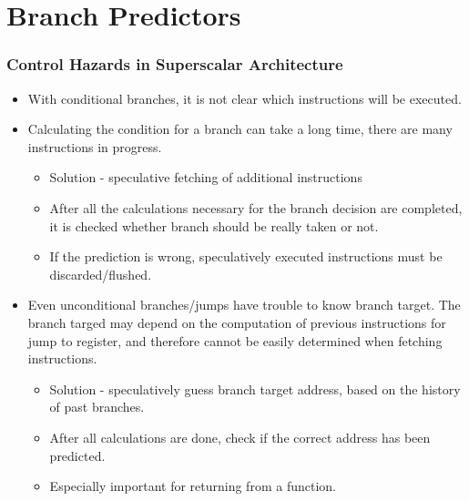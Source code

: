 \documentclass{beamer}
\begin{document}
\section{Branch Predictors}


\begin{frame}
\frametitle{Control Hazards in Superscalar Architecture}

\begin{itemize}
\item With conditional branches, it is not clear which instructions will be executed.
\item Calculating the condition for a branch can take a long time, there are many instructions in progress.
\begin{itemize}
\item Solution - speculative fetching of additional instructions
\item After all the calculations necessary for the branch decision are completed, it is checked whether branch should be really taken or not.
\item If the prediction is wrong, speculatively executed instructions must be discarded/flushed.
\end{itemize}
\item Even unconditional branches/jumps have trouble to know branch target. The branch targed may depend on the computation of previous instructions for jump to register, and therefore cannot be easily determined when fetching instructions.
\begin{itemize}
\item Solution - speculatively guess branch target address, based on the history of past branches.
\item After all calculations are done, check if the correct address has been predicted.
\item Especially important for returning from a function.
\end{itemize}
\end{itemize}

\end{frame}
\end{document}
